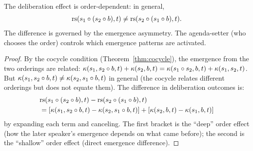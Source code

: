 \begin{theorem}
\label{thm:agenda-setting}
The deliberation effect is order-dependent: in general,
\[
\mathrm{rs}(s_1 \circ (s_2 \circ b), t) \neq \mathrm{rs}(s_2 \circ (s_1 \circ b), t).
\]
The difference is governed by the emergence asymmetry. The agenda-setter
(who chooses the order) controls which emergence patterns are activated.
\end{theorem}

\begin{proof}
By the cocycle condition (Theorem~\ref{thm:cocycle}), the emergence from
the two orderings are related:
$\kappa(s_1, s_2 \circ b, t) + \kappa(s_2, b, t)
= \kappa(s_1 \circ s_2, b, t) + \kappa(s_1, s_2, t)$.
But $\kappa(s_1, s_2 \circ b, t) \neq \kappa(s_2, s_1 \circ b, t)$
in general (the cocycle relates different orderings but does not equate
them). The difference in deliberation outcomes is:
\begin{align*}
&\mathrm{rs}(s_1 \circ (s_2 \circ b), t) - \mathrm{rs}(s_2 \circ (s_1 \circ b), t) \\
&= [\kappa(s_1, s_2 \circ b, t) - \kappa(s_2, s_1 \circ b, t)]
   + [\kappa(s_2, b, t) - \kappa(s_1, b, t)]
\end{align*}
by expanding each term and canceling. The first bracket is the ``deep''
order effect (how the later speaker's emergence depends on what came before);
the second is the ``shallow'' order effect (direct emergence difference).
\end{proof}

